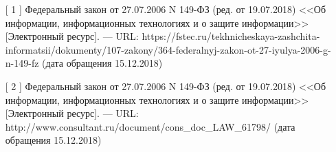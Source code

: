 \begin{enumerate}
	\item[[ 1]]  Федеральный закон от 27.07.2006 N 149-ФЗ (ред. от 19.07.2018) <<Об информации, информационных технологиях и о защите информации>> [Электронный ресурс]. — URL: https://fstec.ru/tekhnicheskaya-zashchita-informatsii/dokumenty/107-zakony/364-federalnyj-zakon-ot-27-iyulya-2006-g-n-149-fz (дата обращения 15.12.2018)
	\item[[ 2]]  Федеральный закон от 27.07.2006 N 149-ФЗ (ред. от 19.07.2018) <<Об информации, информационных технологиях и о защите информации>> [Электронный ресурс]. — URL: \\http://www.consultant.ru/document/cons\_doc\_LAW\_61798/ (дата обращения 15.12.2018)
\end{enumerate}



